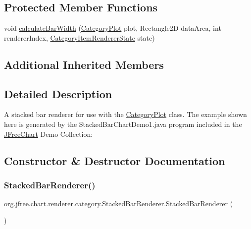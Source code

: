 \subsection*{Protected Member Functions}
\begin{DoxyCompactItemize}
\item 
void \mbox{\hyperlink{classorg_1_1jfree_1_1chart_1_1renderer_1_1category_1_1_stacked_bar_renderer_a7f0f60503e6ab77cde726d92538c16f7}{calculate\+Bar\+Width}} (\mbox{\hyperlink{classorg_1_1jfree_1_1chart_1_1plot_1_1_category_plot}{Category\+Plot}} plot, Rectangle2D data\+Area, int renderer\+Index, \mbox{\hyperlink{classorg_1_1jfree_1_1chart_1_1renderer_1_1category_1_1_category_item_renderer_state}{Category\+Item\+Renderer\+State}} state)
\end{DoxyCompactItemize}
\subsection*{Additional Inherited Members}


\subsection{Detailed Description}
A stacked bar renderer for use with the \mbox{\hyperlink{}{Category\+Plot}} class. The example shown here is generated by the {\ttfamily Stacked\+Bar\+Chart\+Demo1.\+java} program included in the \mbox{\hyperlink{classorg_1_1jfree_1_1chart_1_1_j_free_chart}{J\+Free\+Chart}} Demo Collection\+: ~\newline
~\newline
  

\subsection{Constructor \& Destructor Documentation}
\mbox{\label{classorg_1_1jfree_1_1chart_1_1renderer_1_1category_1_1_stacked_bar_renderer_a4a26d87d89e56fadd50a2adf7f88d85d}} 
\subsubsection{\texorpdfstring{Stacked\+Bar\+Renderer()}{StackedBarRenderer()}\hspace{0.1cm}{\footnotesize\ttfamily [1/2]}}
{\footnotesize\ttfamily org.\+jfree.\+chart.\+renderer.\+category.\+Stacked\+Bar\+Renderer.\+Stacked\+Bar\+Renderer (\begin{DoxyParamCaption}{ }\end{DoxyParamCaption})}

